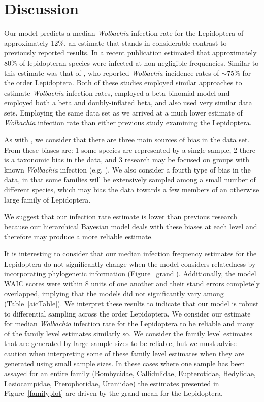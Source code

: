 \documentclass{frontiersSCNS} %
\begin{document}
\section{Discussion}
Our model predicts a median \emph{Wolbachia} infection rate for the Lepidoptera of approximately 12\%, an estimate that stands in considerable contrast to previously reported results. In a recent publication \citet{Ahmed:2015aa} estimated that approximately 80\% of lepidopteran species were infected at non-negligible frequencies. Similar to this estimate was that of \citet{Weinert:2015aa}, who reported \emph{Wolbachia} incidence rates of $\sim$75\% for the order Lepidoptera. Both of these studies employed similar approaches to estimate \emph{Wolbachia} infection rates, \citet{Ahmed:2015aa} employed a beta-binomial model  and \citet{Weinert:2015aa} employed both a beta and doubly-inflated beta, and also used very similar data sets. Employing the same data set as \citet{Weinert:2015aa} we arrived at a much lower estimate of \emph{Wolbachia} infection rate than either previous study examining the Lepidoptera. 

As with \citet{Weinert:2015aa}, we consider that there are three main sources of bias in the data set. From \citet{Weinert:2015aa} these biases are: 1\) some species are represented by a single sample, 2\) there is a taxonomic bias in the data, and 3\) research may be focused on groups with known \emph{Wolbachia} infection (e.g. \citet{Nice:2009p7399}). We also consider a fourth type of bias in the data, in that some families will be extensively sampled among a small number of different species, which may bias the data towards a few members of an otherwise large family of Lepidoptera.

We suggest that our infection rate estimate is lower than previous research because our hierarchical Bayesian model deals with these biases at each level and therefore may produce a more reliable estimate.

It is interesting to consider that our median infection frequency estimates for the Lepidoptera do not significantly change when the model considers relatedness by incorporating phylogenetic information (Figure~\ref{grand}). Additionally, the model WAIC scores were within 8 units of one another and their stand errors completely overlapped, implying that the models did not significantly vary among (Table~\ref{aicTable}). We interpret these results to indicate that our model is robust to differential sampling across the order Lepidoptera. We consider our estimate for median \emph{Wolbachia} infection rate for the Lepidoptera to be reliable and many of the family level estimates similarly so. We consider the family level estimates that are generated by large sample sizes to be reliable, but we must advise caution when interpreting some of these family level estimates when they are generated using small sample sizes. In these cases where one sample has been assayed for an entire family (Bombycidae, Callidulidae, Eupterotidae, Hedylidae, Lasiocampidae, Pterophoridae, Uraniidae) the estimates presented in Figure~\ref{familyplot} are driven by the grand mean for the Lepidoptera.
\end{document}

